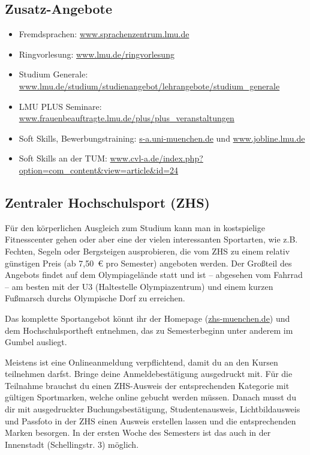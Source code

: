 \subsection{Zusatz-Angebote}
\begin{itemize}
	\item Fremdsprachen: \url{www.sprachenzentrum.lmu.de}
	\item Ringvorlesung: \url{www.lmu.de/ringvorlesung}
	\item Studium Generale: \newline \url{www.lmu.de/studium/studienangebot/lehrangebote/studium_generale}
	\item LMU PLUS Seminare: \url{www.frauenbeauftragte.lmu.de/plus/plus_veranstaltungen}
	\item Soft Skills, Bewerbungstraining: \url{s-a.uni-muenchen.de} und \url{www.jobline.lmu.de}
	\item Soft Skills an der TUM: \newline \url{www.cvl-a.de/index.php?option=com_content&view=article&id=24}
\end{itemize}


\clearpage


\subsection{Zentraler Hochschulsport (ZHS)}
Für den körperlichen Ausgleich zum Studium kann man in kostspielige Fitnesscenter gehen oder aber eine der vielen interessanten Sportarten, wie z.B. Fechten, Segeln oder Bergsteigen ausprobieren, die vom ZHS zu einem relativ günstigen Preis (ab 7,50~€ pro Semester) angeboten werden. Der Großteil des Angebots findet auf dem Olympiagelände statt und ist -- abgesehen vom Fahrrad -- am besten mit der U3 (Haltestelle Olympiazentrum) und einem kurzen Fußmarsch durchs Olympische Dorf zu erreichen.

Das komplette Sportangebot könnt ihr der Homepage (\url{zhs-muenchen.de}) und dem Hochschulsportheft entnehmen, das zu Semesterbeginn unter anderem im Gumbel ausliegt.

Meistens ist eine Onlineanmeldung verpflichtend, damit du an den
Kursen teilnehmen darfst. Bringe deine Anmeldebestätigung ausgedruckt
mit. Für die Teilnahme brauchst du einen ZHS-Ausweis der
entsprechenden Kategorie mit gültigen Sportmarken, welche online
gebucht werden müssen. Danach musst du dir mit ausgedruckter
Buchungsbestätigung, Studentenausweis, Lichtbildausweis und Passfoto
in der ZHS einen Ausweis erstellen lassen und die entsprechenden
Marken besorgen. In der ersten Woche des Semesters ist das auch in der
Innenstadt (Schellingstr. 3) möglich.



